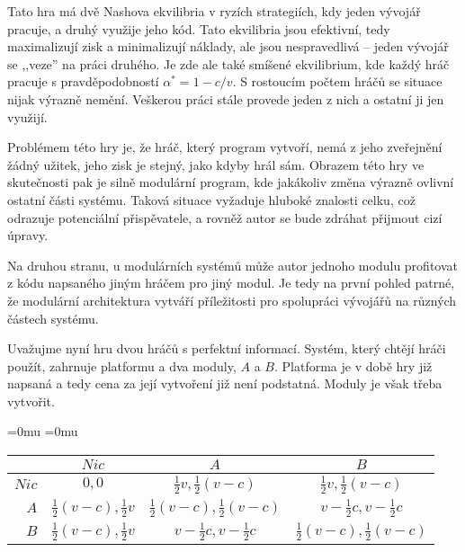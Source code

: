 \begin{multicols}{2}
	Tato hra má dvě Nashova ekvilibria v ryzích strategiích, kdy jeden vývojář pracuje, a druhý využije jeho kód. Tato ekvilibria jsou efektivní, tedy maximalizují zisk a minimalizují náklady, ale jsou nespravedlivá -- jeden vývojář se ,,veze'' na práci druhého. Je zde ale také smíšené ekvilibrium, kde  každý hráč pracuje s pravděpodobností $\alpha^* = 1-c/v$. S rostoucím počtem hráčů se situace nijak výrazně nemění. Veškerou práci stále provede jeden z nich a ostatní ji jen využijí.

	Problémem této hry je, že hráč, který program vytvoří, nemá z jeho zveřejnění žádný užitek, jeho zisk je stejný, jako kdyby hrál sám. Obrazem této hry ve skutečnosti pak je silně modulární program, kde jakákoliv změna výrazně ovlivní ostatní části systému. Taková situace vyžaduje hluboké znalosti celku, což odrazuje potenciální přispěvatele, a rovněž autor se bude zdráhat přijmout cizí úpravy.

	Na druhou stranu, u modulárních systémů může autor jednoho modulu profitovat z kódu napsaného jiným hráčem pro jiný modul. Je tedy na první pohled patrné, že modulární architektura vytváří příležitosti pro spolupráci vývojářů na různých částech systému.

	Uvažujme nyní hru dvou hráčů s perfektní informací. Systém, který chtějí hráči použít, zahrnuje platformu a dva moduly, $A$ a $B$. Platforma je v době hry již napsaná a tedy cena za její vytvoření již není podstatná. Moduly je však třeba vytvořit.


		\begin{Figure}
		\begin{center}
		\begingroup
		\medmuskip=0mu
		\thickmuskip=0mu
			\makeatletter\def\f@size{8}
		\hskip-0.7cm
		\begin{tabular}{r| c c c}
				& $Nic$ & $A$ & $B$ \\
				\hline
			$Nic$ &
			 	$0,0$ &
				$\frac{1}{2}v, \frac{1}{2}(v-c)$ &
				$\frac{1}{2}v, \frac{1}{2}(v-c)$ \\
			$A$ &
				$\frac{1}{2}(v-c), \frac{1}{2}v$ &
				$\frac{1}{2}(v-c), \frac{1}{2}(v-c)$ &
				\cellcolor{gray!20}$v-\frac{1}{2}c, v-\frac{1}{2}c$ \\
			$B$ &
				$\frac{1}{2}(v-c), \frac{1}{2}v$ &
				\cellcolor{gray!20}$v-\frac{1}{2}c, v-\frac{1}{2}c$ &
				$\frac{1}{2}(v-c), \frac{1}{2}(v-c)$ \\
		\end{tabular}
		\endgroup
		\end{center}
		\label{tab:involuntary-altruism-modules-perfect-information}
		\end{Figure}


\end{multicols}

